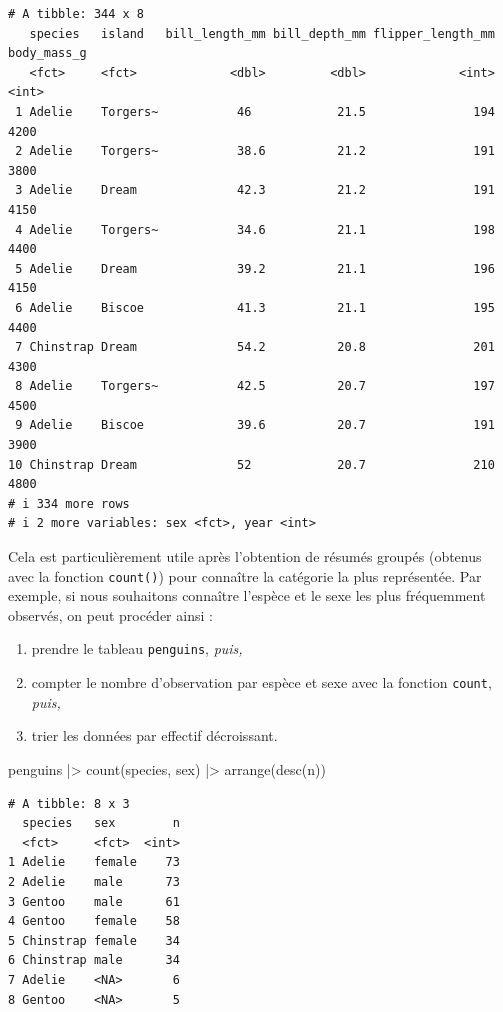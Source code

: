 \documentclass[
  a4paper,
  DIV=11,
  numbers=noendperiod,
  oneside]{scrreprt}
\newenvironment{Shaded}{}{}
\newcommand{\FunctionTok}[1]{\textcolor[rgb]{0.44,0.26,0.76}{#1}}
\newcommand{\NormalTok}[1]{\textcolor[rgb]{0.14,0.16,0.18}{#1}}
\newcommand{\SpecialCharTok}[1]{\textcolor[rgb]{0.00,0.36,0.77}{#1}}
\providecommand{\tightlist}{%
  \setlength{\itemsep}{0pt}\setlength{\parskip}{0pt}}\usepackage{longtable,booktabs,array}
\begin{document}
\begin{verbatim}
# A tibble: 344 x 8
   species   island   bill_length_mm bill_depth_mm flipper_length_mm body_mass_g
   <fct>     <fct>             <dbl>         <dbl>             <int>       <int>
 1 Adelie    Torgers~           46            21.5               194        4200
 2 Adelie    Torgers~           38.6          21.2               191        3800
 3 Adelie    Dream              42.3          21.2               191        4150
 4 Adelie    Torgers~           34.6          21.1               198        4400
 5 Adelie    Dream              39.2          21.1               196        4150
 6 Adelie    Biscoe             41.3          21.1               195        4400
 7 Chinstrap Dream              54.2          20.8               201        4300
 8 Adelie    Torgers~           42.5          20.7               197        4500
 9 Adelie    Biscoe             39.6          20.7               191        3900
10 Chinstrap Dream              52            20.7               210        4800
# i 334 more rows
# i 2 more variables: sex <fct>, year <int>
\end{verbatim}

Cela est particulièrement utile après l'obtention de résumés groupés
(obtenus avec la fonction \texttt{count()}) pour connaître la catégorie
la plus représentée. Par exemple, si nous souhaitons connaître l'espèce
et le sexe les plus fréquemment observés, on peut procéder ainsi :

\begin{enumerate}
\def\labelenumi{\arabic{enumi}.}
\tightlist
\item
  prendre le tableau \texttt{penguins}, \emph{puis,}
\item
  compter le nombre d'observation par espèce et sexe avec la fonction
  \texttt{count}, \emph{puis,}
\item
  trier les données par effectif décroissant.
\end{enumerate}

\begin{Shaded}
\begin{Highlighting}[]
\NormalTok{penguins }\SpecialCharTok{|\textgreater{}}
  \FunctionTok{count}\NormalTok{(species, sex) }\SpecialCharTok{|\textgreater{}}
  \FunctionTok{arrange}\NormalTok{(}\FunctionTok{desc}\NormalTok{(n))}
\end{Highlighting}
\end{Shaded}

\begin{verbatim}
# A tibble: 8 x 3
  species   sex        n
  <fct>     <fct>  <int>
1 Adelie    female    73
2 Adelie    male      73
3 Gentoo    male      61
4 Gentoo    female    58
5 Chinstrap female    34
6 Chinstrap male      34
7 Adelie    <NA>       6
8 Gentoo    <NA>       5
\end{verbatim}
\end{document}
